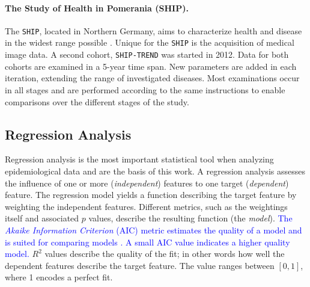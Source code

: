 \documentclass[journal]{style/vgtc} 			          %
\newcommand{\add}[1]{\textcolor{blue}{#1}}
\begin{document}
\paragraph{The Study of Health in Pomerania (SHIP).}
The \texttt{SHIP}, located in Northern Germany, aims to characterize health and disease in the widest range possible \cite{Volzke2011}.
Unique for the \texttt{SHIP} is the acquisition of medical image data.
A second cohort, \texttt{SHIP-TREND} was started in 2012.
Data for both cohorts are examined in a 5-year time span.
New parameters are added in each iteration, extending the range of investigated diseases.
Most examinations occur in all stages and are performed according to the same instructions to enable comparisons over the different stages of the study.

\subsection{Regression Analysis} \label{sec:RegressionAnalysis}
Regression analysis is the most important statistical tool when analyzing epidemiological data and are the basis of this work.
A regression analysis assesses the influence of one or more (\emph{independent}) features to one target (\emph{dependent}) feature.
The regression model yields a function describing the target feature by weighting the independent features.
Different metrics, such as the weightings itself and associated $p$ values, describe the resulting function (the \emph{model}).
\add{
The \emph{Akaike Information Criterion} (AIC) metric estimates the quality of a model and is suited for comparing models \cite{Akaike}.
A small AIC value indicates a higher quality model.
}
$R^2$ values describe the quality of the fit; in other words how well the dependent features describe the target feature.
The value ranges between $[0, 1]$, where 1 encodes a perfect fit.
\end{document}
